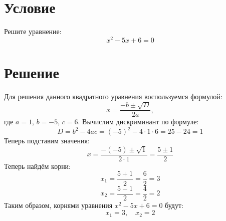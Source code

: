 \documentclass[a4paper, 12pt]{article}
\begin{document}
\section{Условие}
Решите уравнение:
\[x^2 - 5x + 6 = 0\]
\section{Решение}
Для решения данного квадратного уравнения воспользуемся формулой:
\[x = \frac{-b \pm \sqrt{D}}{2a},\]
где \( a = 1 \), \( b = -5 \), \( c = 6 \).
Вычислим дискриминант по формуле:
\[D = b^2 - 4ac = (-5)^2 - 4 \cdot 1 \cdot 6 = 25 - 24 = 1\]
Теперь подставим значения:
\[x = \frac{-(-5) \pm \sqrt{1}}{2 \cdot 1} = \frac{5 \pm 1}{2}\]
Теперь найдём корни:
\[x_1 = \frac{5 + 1}{2} = \frac{6}{2} = 3\]
\[x_2 = \frac{5 - 1}{2} = \frac{4}{2} = 2\]
Таким образом, корнями уравнения \( x^2 - 5x + 6 = 0 \) будут:
\[x_1 = 3, \quad x_2 = 2\]
\end{document}
